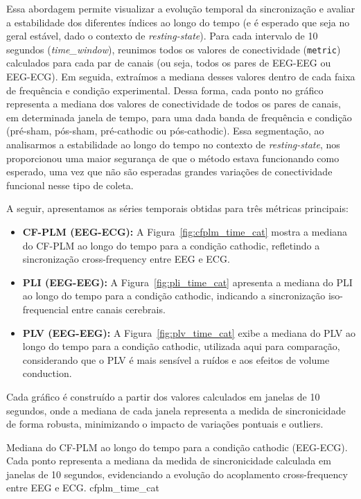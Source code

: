 \begin{itemize}
Essa abordagem permite visualizar a evolução temporal da sincronização e avaliar a estabilidade dos diferentes índices ao longo do tempo (e é esperado que seja no geral estável, dado o contexto de \textit{resting-state}). Para cada intervalo de 10 segundos (\textit{time_window}), reunimos todos os valores de conectividade (\texttt{metric}) calculados para cada par de canais (ou seja, todos os pares de EEG-EEG ou EEG-ECG). Em seguida, extraímos a mediana desses valores dentro de cada faixa de frequência e condição experimental. Dessa forma, cada ponto no gráfico representa a mediana dos valores de conectividade de todos os pares de canais, em determinada janela de tempo, para uma dada banda de frequência e condição (pré-sham, pós-sham, pré-cathodic ou pós-cathodic). Essa segmentação, ao analisarmos a estabilidade ao longo do tempo no contexto de \textit{resting-state}, nos proporcionou uma maior segurança de que o método estava funcionando como esperado, uma vez que não são esperadas grandes variações de conectividade funcional nesse tipo de coleta.

A seguir, apresentamos as séries temporais obtidas para três métricas principais:

\begin{itemize}
    \item \textbf{CF-PLM (EEG-ECG):} A Figura~\ref{fig:cfplm_time_cat} mostra a mediana do CF-PLM ao longo do tempo para a condição cathodic, refletindo a sincronização cross-frequency entre EEG e ECG.
    \item \textbf{PLI (EEG-EEG):} A Figura~\ref{fig:pli_time_cat} apresenta a mediana do PLI ao longo do tempo para a condição cathodic, indicando a sincronização iso-frequencial entre canais cerebrais.
    \item \textbf{PLV (EEG-EEG):} A Figura~\ref{fig:plv_time_cat} exibe a mediana do PLV ao longo do tempo para a condição cathodic, utilizada aqui para comparação, considerando que o PLV é mais sensível a ruídos e aos efeitos de volume conduction.
\end{itemize}

Cada gráfico é construído a partir dos valores calculados em janelas de 10 segundos, onde a mediana de cada janela representa a medida de sincronicidade de forma robusta, minimizando o impacto de variações pontuais e outliers.

{Mediana do CF-PLM ao longo do tempo para a condição cathodic (EEG-ECG). Cada ponto representa a mediana da medida de sincronicidade calculada em janelas de 10 segundos, evidenciando a evolução do acoplamento cross-frequency entre EEG e ECG.}
{cfplm_time_cat}


\end{itemize}
